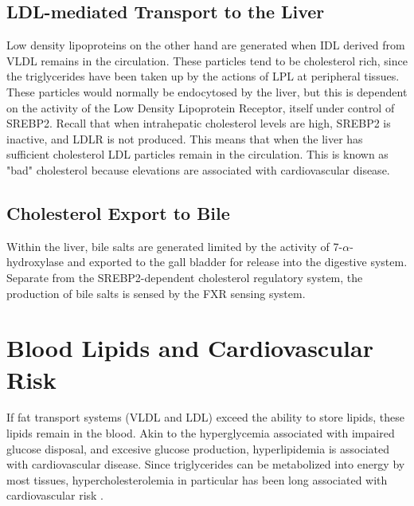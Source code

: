 \documentclass{tufte-handout}
\begin{document}
\subsection{LDL-mediated Transport to the Liver}

Low density lipoproteins on the other hand are generated when IDL derived from VLDL remains in the circulation.  These particles tend to be cholesterol rich, since the triglycerides have been taken up by the actions of LPL at peripheral tissues.  These particles would normally be endocytosed by the liver, but this is dependent on the activity of the Low Density Lipoprotein Receptor, itself under control of SREBP2.  Recall that when intrahepatic cholesterol levels are high, SREBP2 is inactive, and LDLR is not produced.  This means that when the liver has sufficient cholesterol LDL particles remain in the circulation.  This is known as "bad" cholesterol because elevations are associated with cardiovascular disease.  

\subsection{Cholesterol Export to Bile}

Within the liver, bile salts are generated limited by the activity of 7-$\alpha$-hydroxylase and exported to the gall bladder for release into the digestive system.  Separate from the SREBP2-dependent cholesterol regulatory system, the production of bile salts is sensed by the FXR sensing system.

\section{Blood Lipids and Cardiovascular Risk}

If fat transport systems (VLDL and LDL) exceed the ability to store lipids, these lipids remain in the blood.  Akin to the hyperglycemia associated with impaired glucose disposal, and excesive glucose production, hyperlipidemia is associated with cardiovascular disease.  Since triglycerides can be metabolized into energy by most tissues, hypercholesterolemia in particular has been long associated with cardiovascular risk \citep{Keys1963}.
\end{document}
